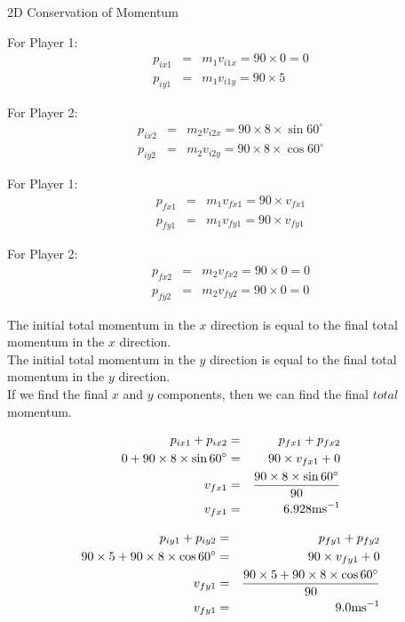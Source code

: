 \begin{wex}{2D Conservation of Momentum}
{For Player 1:
\begin{eqnarray*}
p_{ix1} &=& m_{1}v_{i1x} = 90 \times 0 = 0 \\
p_{iy1} &=& m_{1}v_{i1y} = 90 \times 5 
\end{eqnarray*}

For Player 2:
\begin{eqnarray*}
p_{ix2} &=& m_{2}v_{i2x} = 90 \times 8\times \sin{60^{\circ}} \\
p_{iy2} &=& m_{2}v_{i2y} = 90 \times 8\times \cos{60^{\circ}} 
\end{eqnarray*}

For Player 1:
\begin{eqnarray*}
p_{fx1} &=& m_{1}v_{fx1} = 90 \times v_{fx1}\\
p_{fy1} &=& m_{1}v_{fy1} = 90 \times v_{fy1}
\end{eqnarray*}

For Player 2:
\begin{eqnarray*}
p_{fx2} &=& m_{2}v_{fx2} = 90 \times 0 = 0 \\
p_{fy2} &=& m_{2}v_{fy2} = 90 \times 0 = 0
\end{eqnarray*}

The initial total momentum in the $x$ direction is equal to the final total momentum in the $x$ direction.\\
The initial total momentum in the $y$ direction is equal to the final total momentum in the $y$ direction.\\
If we find the final $x$ and $y$ components, then we can find the final $total$ momentum.

\begin{eqnarray*}
p_{ix1} + p_{ix2} &=& p_{fx1} + p_{fx2} \\
0 + 90 \times 8\times \sin{60^{\circ}} &=& 90 \times v_{fx1} + 0 \\
v_{fx1} &=& \frac{90 \times 8\times \sin{60^{\circ}} }{90} \\
v_{fx1} &=& 6.928 \rm{ms^{-1}}
\end{eqnarray*}

\begin{eqnarray*}
p_{iy1} + p_{iy2} &=& p_{fy1} + p_{fy2} \\
90\times 5 + 90\times 8\times \cos{60^{\circ}} &=& 90\times v_{fy1} + 0 \\
v_{fy1} &=& \frac{90\times 5 + 90\times 8\times \cos{60^{\circ}}}{90} \\
v_{fy1} &=& 9.0 \rm{ms^{-1}}
\end{eqnarray*}

}
\end{wex}
